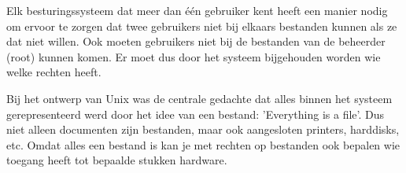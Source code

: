 Elk besturingssysteem dat meer dan \'e\'en gebruiker kent heeft een manier nodig om ervoor te zorgen dat twee gebruikers niet bij elkaars bestanden kunnen als ze dat niet willen. Ook moeten gebruikers niet bij de bestanden van de beheerder (root) kunnen komen. Er moet dus door het systeem bijgehouden worden wie welke rechten heeft.

Bij het ontwerp van Unix was de centrale gedachte dat alles binnen het systeem gerepresenteerd werd door het idee van een bestand: 'Everything is a file'. Dus niet alleen documenten zijn bestanden, maar ook aangesloten printers, harddisks, etc. Omdat alles een bestand is kan je met rechten op bestanden ook bepalen wie toegang heeft tot bepaalde stukken hardware.

